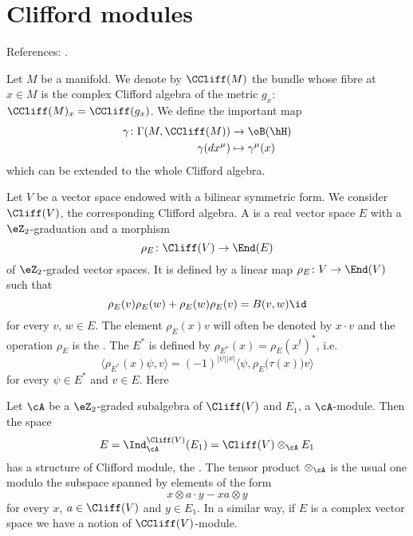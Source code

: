 \section{Clifford modules}  \label{susec_Cliffmodule}

References: \cite{ResEtaDiracType,mellor}.

Let $M$ be a manifold. We denote by $\CCliff(M)$ the bundle whose fibre at $x\in M$ is the complex Clifford algebra of the metric $g_x$: $\CCliff(M)_x=\CCliff(g_x)$. We define the important map
\begin{equation}
\begin{aligned}
 \gamma\colon \Gamma(M,\CCliff(M))&\to \oB(\hH) \\
\gamma(dx^{\mu})&\mapsto \gamma^{\mu}(x)
\end{aligned}
\end{equation}
which can be extended to the whole Clifford algebra.

Let $V$ be a vector space endowed with a bilinear symmetric form. We consider $\Cliff(V)$, the corresponding Clifford algebra. A  is a real vector space $E$ with a $\eZ_2$-graduation and a morphism
\[
  \rho_E\colon \Cliff(V)\to \End(E)
\]
of $\eZ_2$-graded vector spaces. It is defined by a linear map $\rho_E\colon V\to \End(V)$ such that
\begin{equation}
\rho_E(v)\rho_E(w)+\rho_E(w)\rho_E(v)=B(v,w)\id
\end{equation}
for every $v$, $w\in E$. The element $\rho_E(x)v$ will often be denoted by $x\cdot v$ and the operation $\rho_E$ is the . The  $E^*$ is defined by $\rho_{E^*}(x)=\rho_E(x^t)^*$, i.e.
\begin{equation}
\langle \rho_{E^*}(x)\psi,v \rangle =(-1)^{| \psi | |x |}\langle \psi, \rho_E\big( \tau(x) \big)v\rangle
\end{equation}
for every $\psi\in E^*$ and $v\in E$. Here

Let $\cA$ be a $\eZ_2$-graded subalgebra of $\Cliff(V)$ and $E_1$, a $\cA$-module. Then the space
\[
  E=\Ind_{\cA}^{\Cliff(V)}(E_1)=\Cliff(V)\otimes_{\cA}E_1
\]
has a structure of Clifford module, the . The tensor product $\otimes_{\cA}$ is the usual one modulo the subspace spanned by elements of the form
\[
  x\otimes a\cdot y-xa\otimes y
\]
for every $x$, $a\in\Cliff(V)$ and $y\in E_1$. In a similar way, if $E$ is a complex vector space we have a notion of $\CCliff(V)$-module.


